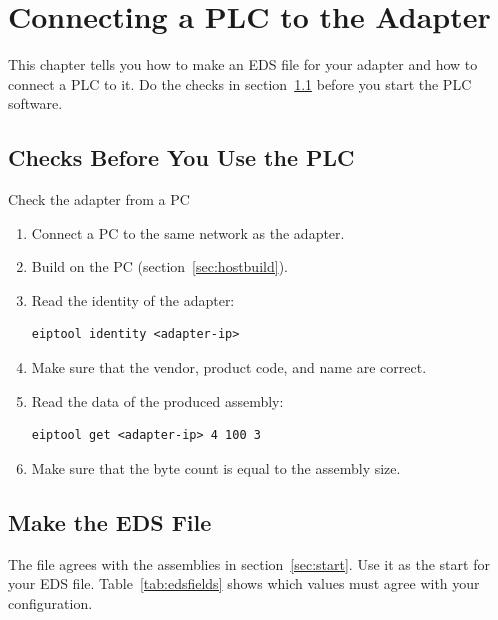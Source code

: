 \chapter{Connecting a PLC to the Adapter}\label{ch:plc}

This chapter tells you how to make an EDS file for your adapter and how to
connect a PLC to it. Do the checks in section~\ref{sec:precheck} before you
start the PLC software.

\section{Checks Before You Use the PLC}\label{sec:precheck}

\begin{procedure}{Check the adapter from a PC}
\begin{enumerate}
  \item Connect a PC to the same network as the adapter.
  \item Build  on the PC (section~\ref{sec:hostbuild}).
  \item Read the identity of the adapter:
\begin{lstlisting}[language=shell]
eiptool identity <adapter-ip>
\end{lstlisting}
  \item Make sure that the vendor, product code, and name are correct.
  \item Read the data of the produced assembly:
\begin{lstlisting}[language=shell]
eiptool get <adapter-ip> 4 100 3
\end{lstlisting}
  \item Make sure that the byte count is equal to the assembly size.
\end{enumerate}
\end{procedure}

\section{Make the EDS File}\label{sec:eds}

The file  agrees with the assemblies
in section~\ref{sec:start}. Use it as the start for your EDS file.
Table~\ref{tab:edsfields} shows which values must agree with your
configuration.

